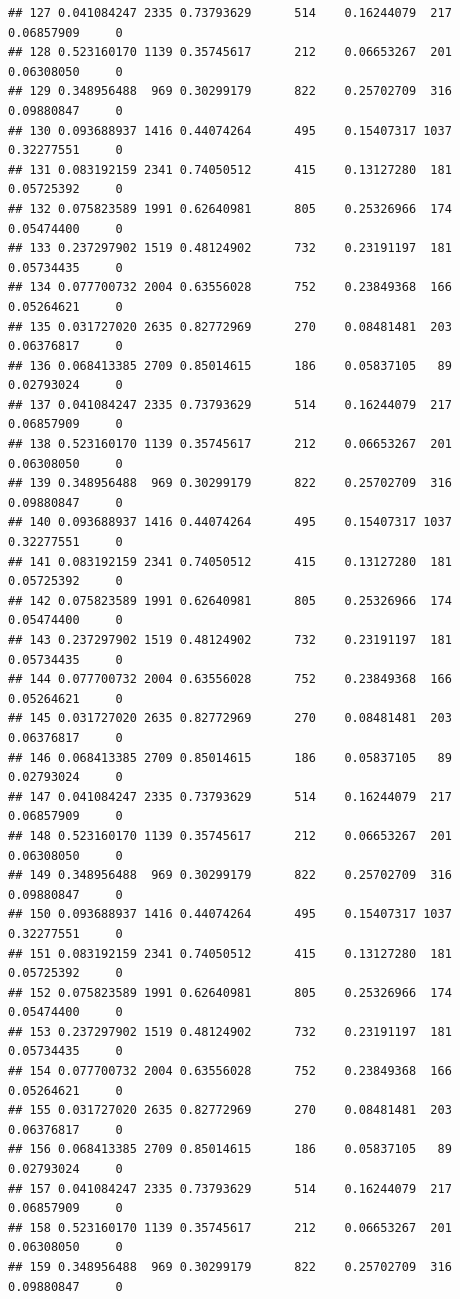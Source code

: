 \documentclass[
]{article}
\begin{document}
\begin{verbatim}
## 127 0.041084247 2335 0.73793629      514    0.16244079  217 0.06857909     0
## 128 0.523160170 1139 0.35745617      212    0.06653267  201 0.06308050     0
## 129 0.348956488  969 0.30299179      822    0.25702709  316 0.09880847     0
## 130 0.093688937 1416 0.44074264      495    0.15407317 1037 0.32277551     0
## 131 0.083192159 2341 0.74050512      415    0.13127280  181 0.05725392     0
## 132 0.075823589 1991 0.62640981      805    0.25326966  174 0.05474400     0
## 133 0.237297902 1519 0.48124902      732    0.23191197  181 0.05734435     0
## 134 0.077700732 2004 0.63556028      752    0.23849368  166 0.05264621     0
## 135 0.031727020 2635 0.82772969      270    0.08481481  203 0.06376817     0
## 136 0.068413385 2709 0.85014615      186    0.05837105   89 0.02793024     0
## 137 0.041084247 2335 0.73793629      514    0.16244079  217 0.06857909     0
## 138 0.523160170 1139 0.35745617      212    0.06653267  201 0.06308050     0
## 139 0.348956488  969 0.30299179      822    0.25702709  316 0.09880847     0
## 140 0.093688937 1416 0.44074264      495    0.15407317 1037 0.32277551     0
## 141 0.083192159 2341 0.74050512      415    0.13127280  181 0.05725392     0
## 142 0.075823589 1991 0.62640981      805    0.25326966  174 0.05474400     0
## 143 0.237297902 1519 0.48124902      732    0.23191197  181 0.05734435     0
## 144 0.077700732 2004 0.63556028      752    0.23849368  166 0.05264621     0
## 145 0.031727020 2635 0.82772969      270    0.08481481  203 0.06376817     0
## 146 0.068413385 2709 0.85014615      186    0.05837105   89 0.02793024     0
## 147 0.041084247 2335 0.73793629      514    0.16244079  217 0.06857909     0
## 148 0.523160170 1139 0.35745617      212    0.06653267  201 0.06308050     0
## 149 0.348956488  969 0.30299179      822    0.25702709  316 0.09880847     0
## 150 0.093688937 1416 0.44074264      495    0.15407317 1037 0.32277551     0
## 151 0.083192159 2341 0.74050512      415    0.13127280  181 0.05725392     0
## 152 0.075823589 1991 0.62640981      805    0.25326966  174 0.05474400     0
## 153 0.237297902 1519 0.48124902      732    0.23191197  181 0.05734435     0
## 154 0.077700732 2004 0.63556028      752    0.23849368  166 0.05264621     0
## 155 0.031727020 2635 0.82772969      270    0.08481481  203 0.06376817     0
## 156 0.068413385 2709 0.85014615      186    0.05837105   89 0.02793024     0
## 157 0.041084247 2335 0.73793629      514    0.16244079  217 0.06857909     0
## 158 0.523160170 1139 0.35745617      212    0.06653267  201 0.06308050     0
## 159 0.348956488  969 0.30299179      822    0.25702709  316 0.09880847     0

\end{verbatim}
\end{document}
